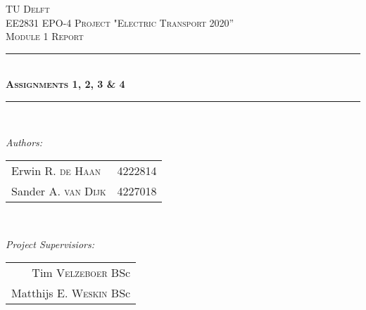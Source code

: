 \documentclass[12pt]{scrreprt}
\begin{document}
\begin{titlepage}

\newcommand{\HRule}{\rule{\linewidth}{0.5mm}} %

\center %
 

\textsc{\LARGE TU Delft}\\[1.5cm] %
\textsc{\Large EE2831 EPO-4 Project "Electric Transport 2020''}\\[0.5cm] %
\textsc{\large Module 1 Report}\\[0.5cm] %


\HRule \\[0.4cm]
\textsc{\huge \bfseries Assignments 1, 2, 3 \& 4}\\[0.2cm] %
\HRule \\[1.5cm]
 

\begin{minipage}{0.45\textwidth}
\begin{flushleft} \large
\emph{Authors:}\\
\begin{tabular}{ll}
Erwin R. \textsc{de Haan} & 4222814\\
Sander A. \textsc{van Dijk} & 4227018\\
\end{tabular}

\end{flushleft}
\end{minipage}
~
\begin{minipage}{0.45\textwidth}
\begin{flushright} \large
\emph{Project Supervisiors:} \\
\begin{tabular}{r}
Tim \textsc{Velzeboer} BSc\\
Matthijs E. \textsc{Weskin} BSc\\
\end{tabular}
\end{flushright}
\end{minipage}\\[1.5cm]


\end{titlepage}
\end{document}
